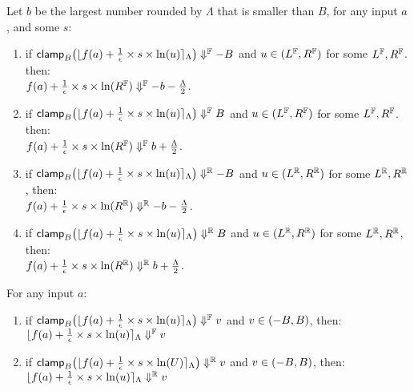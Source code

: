 \documentclass[a4paper,11pt]{article}
\begin{document}
\begin{lem}[clampR]
\label{lem:clampr}
Let $b$ be the largest number rounded by $\Lambda$ that is smaller than $B$, for any input $a$, and some $s$:
\begin{enumerate}
\item 
if 
$\mathsf{clamp}_B \big(
	\lfloor f(a) + \frac{1}{\epsilon} \times s \times \ln (u) \rceil_{\Lambda}
	\big)
	\Downarrow^{\mathbb{F}} -B$ and $u \in (L^{\mathbb{F}}, R^{\mathbb{F}})$ for some $L^{\mathbb{F}}, R^{\mathbb{F}}$.
	 then:
	 \\
	$f(a) + \frac{1}{\epsilon} \times s \times \ln (R^{\mathbb{F}}) \Downarrow^{\mathbb{F}} -b - \frac{\Lambda}{2}$.
%
\item 
if 
$\mathsf{clamp}_B \big(
	\lfloor f(a) + \frac{1}{\epsilon} \times s \times \ln (u) \rceil_{\Lambda}
	\big)
	\Downarrow^{\mathbb{F}} B$ and $u \in (L^{\mathbb{F}}, R^{\mathbb{F}})$ for some $L^{\mathbb{F}}, R^{\mathbb{F}}$.
	 then:
	 \\
	$f(a) + \frac{1}{\epsilon} \times s \times \ln (R^{\mathbb{F}}) \Downarrow^{\mathbb{F}} b + \frac{\Lambda}{2}$.
%
\item
if
$\mathsf{clamp}_B \big(
	\lfloor f(a) + \frac{1}{\epsilon} \times s \times \ln (u) \rceil_{\Lambda}
	\big)
	\Downarrow^{\mathbb{R}} -B$ and $u \in (L^{\mathbb{R}}, R^{\mathbb{R}})$ for some $L^{\mathbb{R}}, R^{\mathbb{R}}$, then:
	 \\
	$f(a) + \frac{1}{\epsilon} \times s \times \ln (R^{\mathbb{R}}) \Downarrow^{\mathbb{R}} -b - \frac{\Lambda}{2}$.
%
\item
if
$\mathsf{clamp}_B \big(
	\lfloor f(a) + \frac{1}{\epsilon} \times s \times \ln (u) \rceil_{\Lambda}
	\big)
	\Downarrow^{\mathbb{R}} B$ and $u \in (L^{\mathbb{R}}, R^{\mathbb{R}})$ for some $L^{\mathbb{R}}, R^{\mathbb{R}}$, then:
	 \\
	$f(a) + \frac{1}{\epsilon} \times s \times \ln (R^{\mathbb{R}}) \Downarrow^{\mathbb{R}} b + \frac{\Lambda}{2}$.
%
\end{enumerate}
\end{lem}
%
%
\begin{lem}[clampId]
\label{lem:clampid}
For any input $a$:
\begin{enumerate}
\item 
if 
$\mathsf{clamp}_B \big(
	\lfloor f(a) + \frac{1}{\epsilon} \times s \times \ln (u) \rceil_{\Lambda}
	\big)
	\Downarrow^{\mathbb{F}} v$ and $v \in (-B, B)$, then:
	$\lfloor f(a) + \frac{1}{\epsilon} \times s \times \ln (u) \rceil_{\Lambda}
	\Downarrow^{\mathbb{F}} v$
%
\item
if
$\mathsf{clamp}_B \big(
	\lfloor f(a) + \frac{1}{\epsilon} \times s \times \ln (U) \rceil_{\Lambda}
	\big)
	\Downarrow^{\mathbb{R}} v$ and $v \in (-B, B)$, then:
	$\lfloor f(a) + \frac{1}{\epsilon} \times s \times \ln (u) \rceil_{\Lambda}
	\Downarrow^{\mathbb{R}} v$
\end{enumerate}
\end{lem}
\end{document}
